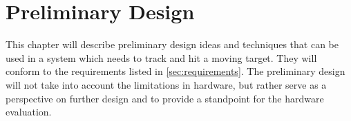 \chapter{Preliminary Design}\label{ch:preldesign}
This chapter will describe preliminary design ideas and techniques that can be used in a system which needs to track and hit a moving target. They will conform to the requirements listed in \cref{sec:requirements}. The preliminary design will not take into account the limitations in hardware, but rather serve as a perspective on further design and to provide a standpoint for the hardware evaluation.




